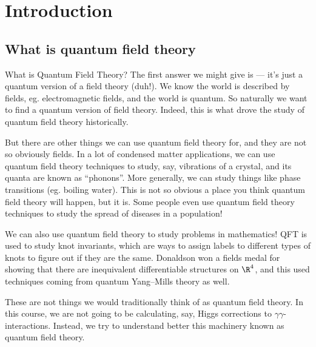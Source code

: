 \documentclass[a4paper]{article}
\begin{document}
\tableofcontents

\setcounter{section}{-1}
\section{Introduction}
\subsection{What is quantum field theory}
What is Quantum Field Theory? The first answer we might give is --- it's just a quantum version of a field theory (duh!). We know the world is described by fields, eg. electromagnetic fields, and the world is quantum. So naturally we want to find a quantum version of field theory. Indeed, this is what drove the study of quantum field theory historically.

But there are other things we can use quantum field theory for, and they are not so obviously fields. In a lot of condensed matter applications, we can use quantum field theory techniques to study, say, vibrations of a crystal, and its quanta are known as ``phonons''. More generally, we can study things like phase transitions (eg. boiling water). This is not so obvious a place you think quantum field theory will happen, but it is. Some people even use quantum field theory techniques to study the spread of diseases in a population!

We can also use quantum field theory to study problems in mathematics! QFT is used to study knot invariants, which are ways to assign labels to different types of knots to figure out if they are the same. Donaldson won a fields medal for showing that there are inequivalent differentiable structures on $\R^4$, and this used techniques coming from quantum Yang--Mills theory as well.

These are not things we would traditionally think of as quantum field theory. In this course, we are not going to be calculating, say, Higgs corrections to $\gamma\gamma$-interactions. Instead, we try to understand better this machinery known as quantum field theory.
\end{document}
